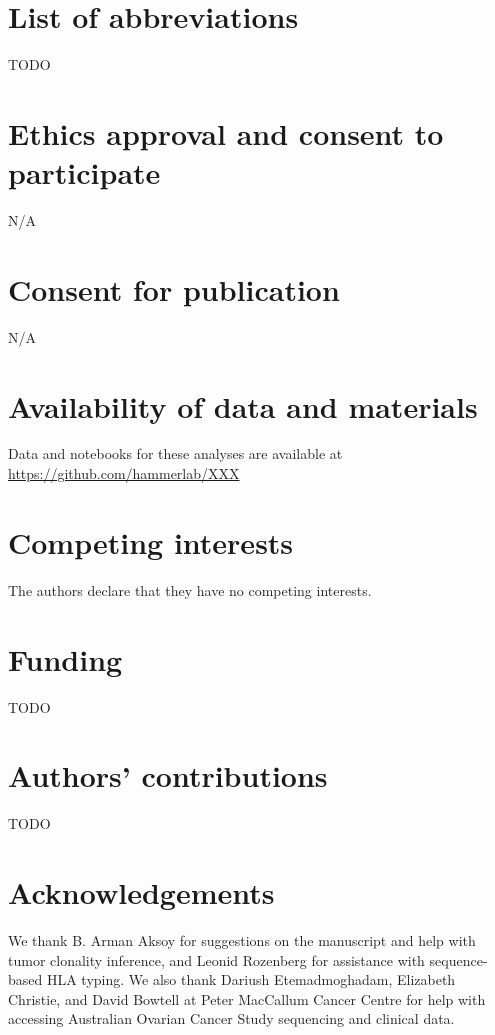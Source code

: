 \section{List of abbreviations}
TODO

\section{Ethics approval and consent to participate}
N/A

\section{Consent for publication}
N/A

\section{Availability of data and materials}
Data and notebooks for these analyses are available at \url{https://github.com/hammerlab/XXX}

\section{Competing interests}
The authors declare that they have no competing interests.

\section{Funding}
TODO

\section{Authors' contributions}
TODO

\section{Acknowledgements}
We thank B. Arman Aksoy for suggestions on the manuscript and help with tumor clonality inference, and Leonid Rozenberg for assistance with sequence-based HLA typing. We also thank Dariush Etemadmoghadam, Elizabeth Christie, and David Bowtell at Peter MacCallum Cancer Centre for help with accessing Australian Ovarian Cancer Study sequencing and clinical data.
